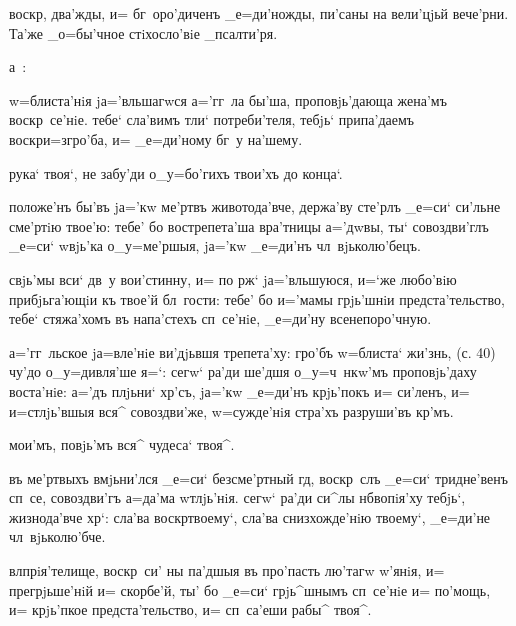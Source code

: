 
воскр, два'жды, и= бг~оро'диченъ _е=ди'ножды, 
пи'саны на вели'цjьй вече'рни. Та'же _о=бы'чное 
стiхосло'вiе _псалти'ря.%

а~:%

w=блиста'нiя jа='вльшагwся а='гг~ла бы'ша, проповjь'дающа 
жена'мъ воскр~се'нiе. тебе` сла'вимъ тли` потреби'теля, 
тебjь` припа'даемъ воскр и=з\ъ гро'ба, и= 
_е=ди'ному бг~у на'шему.

рука` твоя`, не забу'ди о_у=бо'гихъ твои'хъ до конца`.

положе'нъ бы'въ jа='кw ме'ртвъ животода'вче, держа'ву 
сте'рлъ _е=си` си'льне сме'ртiю твое'ю: тебе' бо 
вострепета'ша вра'тницы а='дwвы, ты` совоздви'глъ _е=си` 
w\т вjь'ка о_у=ме'ршыя, jа='кw _е=ди'нъ чл~вjьколю'бецъ.

свjь'мы вси` дв~у вои'стинну, и= по рж` 
jа='вльшуюся, и=`же любо'вiю прибjьга'ющiи къ твое'й 
бл~гости: тебе' бо и='мамы грjь'шнiи предста'тельство, 
тебе` стяжа'хомъ въ напа'стехъ сп~се'нiе, _е=ди'ну 
всенепоро'чную.



а='гг~льское jа=вле'нiе ви'дjьвшя трепета'ху: гро'бъ 
w=блиста` жи'знь, (с. 40) чу'до о_у=дивля'ше я=`: сегw` 
ра'ди ше'дшя о_у=ч~нкw'мъ проповjь'даху воста'нiе: а='дъ 
плjьни` хр'съ, jа='кw _е=ди'нъ крjь'покъ и= си'ленъ, 
и= и=стлjь'вшыя вся^ совоздви'же, w=сужде'нiя стра'хъ 
разруши'въ кр'мъ.

мои'мъ, повjь'мъ вся^ чудеса` твоя^.

въ ме'ртвыхъ вмjьни'лся _е=си` безсме'ртный гд, 
воскр~слъ _е=си` тридне'венъ сп~се, совоздви'гъ а=да'ма 
w\т тлjь'нiя. сегw` ра'ди си^лы нб вопiя'ху тебjь`, 
жизнода'вче хр`: сла'ва воскр твоему`, сла'ва 
снизхожде'нiю твоему`, _е=ди'не чл~вjьколю'бче.

вл прiя'телище, воскр~си' ны па'дшыя въ про'пасть 
лю'тагw w'янiя, и= прегрjьше'нiй и= скорбе'й, ты' бо 
_е=си` грjь^шнымъ сп~се'нiе и= по'мощь, и= крjь'пкое 
предста'тельство, и= сп~са'еши рабы^ твоя^.

